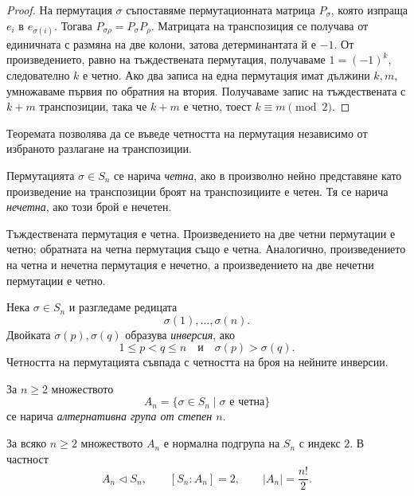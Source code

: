 \begin{proof}
На пермутация $\sigma$ съпоставяме пермутационната матрица $P_\sigma$, която изпраща $e_i$ в $e_{\sigma(i)}$. Тогава $P_{\sigma\rho}=P_\sigma P_\rho$. Матрицата на транспозиция се получава от единичната с размяна на две колони, затова детерминантата й е $-1$. От произведението, равно на тъждествената пермутация, получаваме $1=(-1)^k$, следователно $k$ е четно. Ако два записа на една пермутация имат дължини $k,m$, умножаваме първия по обратния на втория. Получаваме запис на тъждествената с $k+m$ транспозиции, така че $k+m$ е четно, тоест $k\equiv m\pmod2$.
\end{proof}

Теоремата позволява да се въведе четността на пермутация независимо от избраното разлагане на транспозиции.

\begin{defn}
Пермутацията $\sigma\in S_n$ се нарича \emph{четна}, ако в произволно нейно представяне като произведение на транспозиции броят на транспозициите е четен. Тя се нарича \emph{нечетна}, ако този брой е нечетен.
\end{defn}

Тъждествената пермутация е четна. Произведението на две четни пермутации е четно; обратната на четна пермутация също е четна. Аналогично, произведението на четна и нечетна пермутация е нечетно, а произведението на две нечетни пермутации е четно.

\begin{remark}
Нека $\sigma\in S_n$ и разгледаме редицата
\[
\sigma(1),\ldots,\sigma(n).
\]
Двойката $\sigma(p),\sigma(q)$ образува \emph{инверсия}, ако
\[
1\le p<q\le n
\quad\text{и}\quad
\sigma(p)>\sigma(q).
\]
Четността на пермутацията съвпада с четността на броя на нейните инверсии.
\end{remark}

\begin{defn}
За $n\ge2$ множеството
\[
A_n=\{\sigma\in S_n\mid \sigma\text{ е четна}\}
\]
се нарича \emph{алтернативна група от степен $n$}.
\end{defn}

\begin{thm}
За всяко $n\ge2$ множеството $A_n$ е нормална подгрупа на $S_n$ с индекс $2$. В частност
\[
A_n\triangleleft S_n,
\qquad
[S_n:A_n]=2,
\qquad
|A_n|=\frac{n!}{2}.
\]
\end{thm}

